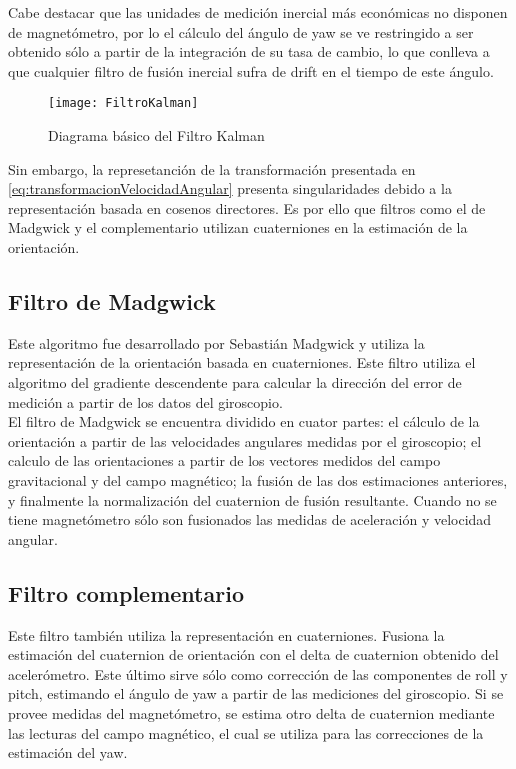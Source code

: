 Cabe destacar que las unidades de medición inercial más económicas no disponen de magnetómetro, por lo el cálculo  del ángulo de yaw se ve restringido a ser obtenido sólo a partir de la integración de su tasa de cambio, lo que conlleva a que cualquier filtro de fusión inercial sufra de drift  en el tiempo de este ángulo.


\begin{figure}[H]
	\centering
	\texttt{[image: FiltroKalman]}
	\caption{Diagrama básico del Filtro Kalman}
	\label{fig:diagramaFiltroKalman}
\end{figure}



Sin embargo, la represetanción de la transformación presentada en \ref{eq:transformacionVelocidadAngular} presenta singularidades debido a la representación basada en cosenos directores. Es por ello que filtros como el de Madgwick y el complementario utilizan cuaterniones en la estimación de la orientación.

\subsection{ Filtro de Madgwick }

Este algoritmo fue desarrollado por Sebastián Madgwick \cite{Madgwick} y utiliza la representación de la orientación basada en cuaterniones. Este filtro utiliza el algoritmo del gradiente descendente para calcular la dirección del error de medición a partir de los datos del giroscopio.\\

El filtro de Madgwick se encuentra dividido en cuator partes: el cálculo de la orientación a partir de las velocidades angulares medidas por el giroscopio; el calculo de las orientaciones a partir de los vectores medidos del campo gravitacional y del campo magnético; la fusión de las dos estimaciones anteriores, y finalmente la normalización del cuaternion de fusión resultante. Cuando no se tiene magnetómetro sólo son fusionados las medidas de aceleración y velocidad angular.

\subsection{ Filtro complementario }
Este filtro también utiliza la representación en cuaterniones. Fusiona la estimación del cuaternion de orientación con el delta de cuaternion obtenido del acelerómetro. Este último sirve sólo como corrección de las componentes de roll y pitch, estimando el ángulo de yaw a partir de las mediciones del giroscopio. Si se provee medidas del magnetómetro, se estima otro delta de cuaternion mediante las lecturas del campo  magnético, el cual se utiliza para las correcciones de la estimación del yaw.\\

